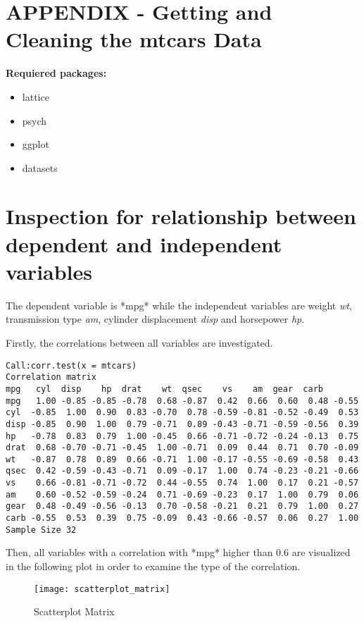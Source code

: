 \documentclass[10pt,a4paper]{article}
\begin{document}
\section{APPENDIX -  Getting and Cleaning the mtcars Data}
\textbf{Requiered packages:}
\begin{itemize}
	\item lattice
	\item psych
	\item ggplot
	\item datasets
\end{itemize}

\section{Inspection for relationship between dependent and independent variables}

The dependent variable is *mpg* while the independent variables are weight \textit{wt}, transmission type \textit{am}, cylinder displacement \textit{disp} and horsepower \textit{hp}. 

Firstly, the correlations between all variables are investigated.

\begin{verbatim}
Call:corr.test(x = mtcars)
Correlation matrix 
mpg   cyl  disp    hp  drat    wt  qsec    vs    am  gear  carb
mpg   1.00 -0.85 -0.85 -0.78  0.68 -0.87  0.42  0.66  0.60  0.48 -0.55
cyl  -0.85  1.00  0.90  0.83 -0.70  0.78 -0.59 -0.81 -0.52 -0.49  0.53
disp -0.85  0.90  1.00  0.79 -0.71  0.89 -0.43 -0.71 -0.59 -0.56  0.39
hp   -0.78  0.83  0.79  1.00 -0.45  0.66 -0.71 -0.72 -0.24 -0.13  0.75
drat  0.68 -0.70 -0.71 -0.45  1.00 -0.71  0.09  0.44  0.71  0.70 -0.09
wt   -0.87  0.78  0.89  0.66 -0.71  1.00 -0.17 -0.55 -0.69 -0.58  0.43
qsec  0.42 -0.59 -0.43 -0.71  0.09 -0.17  1.00  0.74 -0.23 -0.21 -0.66
vs    0.66 -0.81 -0.71 -0.72  0.44 -0.55  0.74  1.00  0.17  0.21 -0.57
am    0.60 -0.52 -0.59 -0.24  0.71 -0.69 -0.23  0.17  1.00  0.79  0.06
gear  0.48 -0.49 -0.56 -0.13  0.70 -0.58 -0.21  0.21  0.79  1.00  0.27
carb -0.55  0.53  0.39  0.75 -0.09  0.43 -0.66 -0.57  0.06  0.27  1.00
Sample Size 32
\end{verbatim}
Then, all variables with a correlation with *mpg* higher than 0.6 are visualized in the following plot in order to examine the type of the correlation.

\begin{figure}
\centering
\texttt{[image: scatterplot\_matrix]}
\caption{Scatterplot Matrix}
\end{figure}
\end{document}
